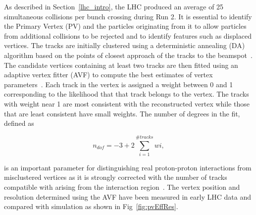 As described in Section~\ref{lhc_intro}, the LHC produced an average of 25 simultaneous collisions per bunch crossing
during Run 2. It is essential to identify the Primary Vertex (PV) and the particles originating from it to allow 
particles from additional collisions to be rejected and to identify features such as displaced vertices. The tracks
are initially clustered using a deterministic annealing (DA) algorithm based on the points of closest approach of the 
tracks to the beamspot~\cite{tracker_vertex}. The candidate vertices containing at least two tracks are then
fitted using an adaptive vertex fitter (AVF) to compute the best estimates of vertex parameters~\cite{tracker_avf}. 
Each track in the vertex is assigned a weight between 0 and 1 corresponding to the likelihood that that track
belongs to the vertex. The tracks with weight near 1 are most consistent with the reconstructed vertex while
those that are least consistent have small weights. The number of degrees in the fit, defined as 

\begin{equation}
n_{dof} = -3 + 2 \sum_{i=1}^{\#tracks} wi,
\end{equation}

is an important parameter for distinguishing real proton-proton interactions from misclustered vertices as it is strongly corrected with
the number of tracks compatible with arising from the interaction region~\cite{tracker_vertex}. The vertex
position and resolution determined using the AVF have been 
measured in early LHC data and compared with simulation as shown in Fig~\ref{fig:pvEffRes}.

